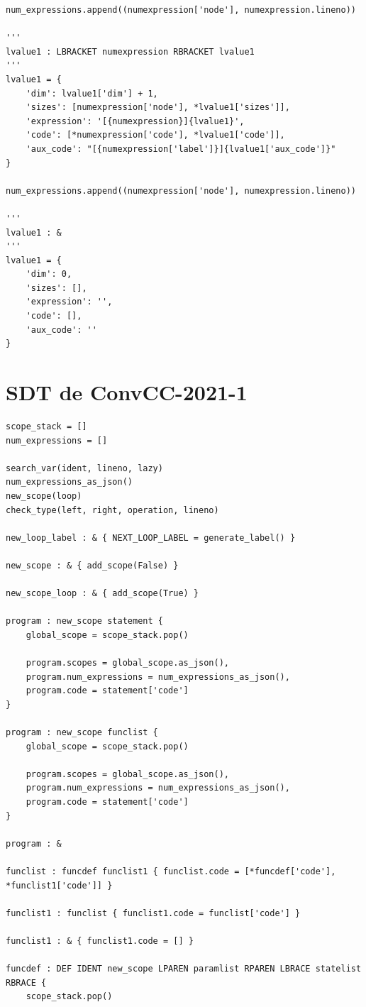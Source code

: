\documentclass[
	12pt,				%
	openright,			%
	twoside,			%
	a4paper,			%
	english,			%
	french,				%
	spanish,			%
	brazil				%
	]{abntex2}
\begin{document}
\begin{apendicesenv}
\begin{lstlisting}
num_expressions.append((numexpression['node'], numexpression.lineno))

'''
lvalue1 : LBRACKET numexpression RBRACKET lvalue1
'''
lvalue1 = {
    'dim': lvalue1['dim'] + 1,
    'sizes': [numexpression['node'], *lvalue1['sizes']],
    'expression': '[{numexpression}]{lvalue1}',
    'code': [*numexpression['code'], *lvalue1['code']],
    'aux_code': "[{numexpression['label']}]{lvalue1['aux_code']}"
}

num_expressions.append((numexpression['node'], numexpression.lineno))

'''
lvalue1 : &
'''
lvalue1 = {
    'dim': 0,
    'sizes': [],
    'expression': '',
    'code': [],
    'aux_code': ''
}

\end{lstlisting}

\chapter{SDT de ConvCC-2021-1}

\begin{lstlisting}
scope_stack = []
num_expressions = []

search_var(ident, lineno, lazy)
num_expressions_as_json()
new_scope(loop)
check_type(left, right, operation, lineno)

new_loop_label : & { NEXT_LOOP_LABEL = generate_label() }

new_scope : & { add_scope(False) }

new_scope_loop : & { add_scope(True) }

program : new_scope statement {
    global_scope = scope_stack.pop()

    program.scopes = global_scope.as_json(),
    program.num_expressions = num_expressions_as_json(),
    program.code = statement['code']
}

program : new_scope funclist {
    global_scope = scope_stack.pop()

    program.scopes = global_scope.as_json(),
    program.num_expressions = num_expressions_as_json(),
    program.code = statement['code']
}

program : &

funclist : funcdef funclist1 { funclist.code = [*funcdef['code'], *funclist1['code']] }

funclist1 : funclist { funclist1.code = funclist['code'] }

funclist1 : & { funclist1.code = [] }

funcdef : DEF IDENT new_scope LPAREN paramlist RPAREN LBRACE statelist RBRACE {
    scope_stack.pop()


\end{lstlisting}
\end{apendicesenv}
\end{document}
